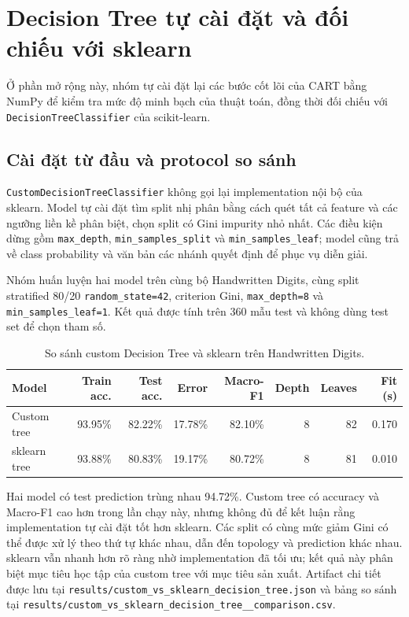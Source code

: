 \section{Decision Tree tự cài đặt và đối chiếu với sklearn}

Ở phần mở rộng này, nhóm tự cài đặt lại các bước cốt lõi của CART bằng NumPy để
kiểm tra mức độ minh bạch của thuật toán, đồng thời đối chiếu với
\texttt{DecisionTreeClassifier} của scikit-learn.

\subsection{Cài đặt từ đầu và protocol so sánh}

\texttt{CustomDecisionTreeClassifier} không gọi lại implementation nội bộ của sklearn.
Model tự cài đặt tìm split nhị phân bằng cách quét tất cả feature và các ngưỡng liền kề
phân biệt, chọn split có Gini impurity nhỏ nhất. Các điều kiện dừng gồm
\texttt{max\_depth}, \texttt{min\_samples\_split} và \texttt{min\_samples\_leaf}; model cũng
trả về class probability và văn bản các nhánh quyết định để phục vụ diễn giải.

Nhóm huấn luyện hai model trên cùng bộ Handwritten Digits, cùng split stratified 80/20
\texttt{random\_state=42}, criterion Gini, \texttt{max\_depth=8} và
\texttt{min\_samples\_leaf=1}. Kết quả được tính trên 360 mẫu test và không dùng test set
để chọn tham số.

\begin{table}[H]
    \centering
    \small
    \caption[So sánh custom tree và sklearn]{So sánh custom Decision Tree và sklearn trên Handwritten Digits.}
    \label{tab:custom-vs-sklearn}
    \setlength{\tabcolsep}{3.5pt}
    \begin{tabularx}{\textwidth}{@{}>{\raggedright\arraybackslash}Xrrrrrrr@{}}
        \toprule
        \textbf{Model} & \textbf{Train acc.} & \textbf{Test acc.} & \textbf{Error} &
        \textbf{Macro-F1} & \textbf{Depth} & \textbf{Leaves} & \textbf{Fit (s)} \\
        \midrule
        Custom tree & 93.95\% & 82.22\% & 17.78\% & 82.10\% & 8 & 82 & 0.170 \\
        sklearn tree & 93.88\% & 80.83\% & 19.17\% & 80.72\% & 8 & 81 & 0.010 \\
        \bottomrule
    \end{tabularx}
\end{table}

Hai model có test prediction trùng nhau 94.72\%. Custom tree có accuracy và Macro-F1
cao hơn trong lần chạy này, nhưng không đủ để kết luận rằng implementation tự cài đặt
tốt hơn sklearn. Các split có cùng mức giảm Gini có thể được xử lý theo thứ tự khác nhau,
dẫn đến topology và prediction khác nhau. sklearn vẫn nhanh hơn rõ ràng nhờ implementation
đã tối ưu; kết quả này phân biệt mục tiêu học tập của custom tree với mục tiêu sản xuất.
Artifact chi tiết được lưu tại \nolinkurl{results/custom_vs_sklearn_decision_tree.json} và bảng
so sánh tại \nolinkurl{results/custom_vs_sklearn_decision_tree__comparison.csv}.

